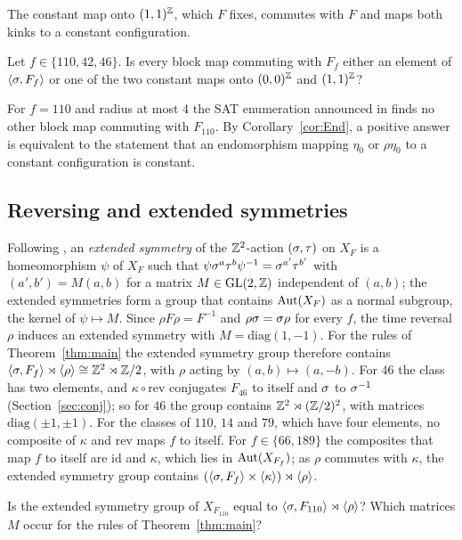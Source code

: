 The constant map onto $(1,1)^{\mathbb{Z}}$, which $F$ fixes, commutes with $F$ and maps both kinks to a constant configuration.

\begin{question}\label{q:End}
Let $f\in\{110,42,46\}$. Is every block map commuting with $F_f$ either an element of $\langle\sigma,F_f\rangle$ or one of the two constant maps onto $(0,0)^{\mathbb{Z}}$ and $(1,1)^{\mathbb{Z}}$?
\end{question}

For $f=110$ and radius at most $4$ the SAT enumeration announced in \cite{PaperD} finds no other block map commuting with $F_{110}$. By Corollary~\ref{cor:End}, a positive answer is equivalent to the statement that an endomorphism mapping $\eta_0$ or $\rho\eta_0$ to a constant configuration is constant.

\subsection{Reversing and extended symmetries}\label{sec:rev}
Following \cite{BRY2018}, an \emph{extended symmetry} of the $\mathbb{Z}^2$-action $(\sigma,\tau)$ on $X_F$ is a homeomorphism $\psi$ of $X_F$ such that $\psi\sigma^a\tau^b\psi^{-1}=\sigma^{a'}\tau^{b'}$ with $(a',b')=M(a,b)$ for a matrix $M\in\mathrm{GL}(2,\mathbb{Z})$ independent of $(a,b)$; the extended symmetries form a group that contains $\operatorname{Aut}(X_F)$ as a normal subgroup, the kernel of $\psi\mapsto M$. Since $\rho F\rho=F^{-1}$ and $\rho\sigma=\sigma\rho$ for every $f$, the time reversal $\rho$ induces an extended symmetry with $M=\mathrm{diag}(1,-1)$. For the rules of Theorem~\ref{thm:main} the extended symmetry group therefore contains $\langle\sigma,F_f\rangle\rtimes\langle\rho\rangle\cong\mathbb{Z}^2\rtimes\mathbb{Z}/2$, with $\rho$ acting by $(a,b)\mapsto(a,-b)$. For $46$ the class has two elements, and $\kappa\circ\mathrm{rev}$ conjugates $F_{46}$ to itself and $\sigma$ to $\sigma^{-1}$ (Section~\ref{sec:conj}); so for $46$ the group contains $\mathbb{Z}^2\rtimes(\mathbb{Z}/2)^2$, with matrices $\mathrm{diag}(\pm1,\pm1)$. For the classes of $110$, $14$ and $79$, which have four elements, no composite of $\kappa$ and $\mathrm{rev}$ maps $f$ to itself. For $f\in\{66,189\}$ the composites that map $f$ to itself are $\mathrm{id}$ and $\kappa$, which lies in $\operatorname{Aut}(X_{F_f})$; as $\rho$ commutes with $\kappa$, the extended symmetry group contains $(\langle\sigma,F_f\rangle\times\langle\kappa\rangle)\rtimes\langle\rho\rangle$.

\begin{question}\label{q:ext}
Is the extended symmetry group of $X_{F_{110}}$ equal to $\langle\sigma,F_{110}\rangle\rtimes\langle\rho\rangle$? Which matrices $M$ occur for the rules of Theorem~\ref{thm:main}?
\end{question}

